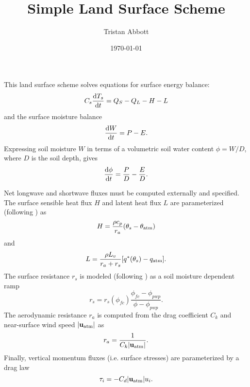 \documentclass[10pt]{article}
\title{Simple Land Surface Scheme}
\author{Tristan Abbott}
\date{\today}
\begin{document}
\maketitle

This land surface scheme solves equations for surface energy balance:
\begin{equation}
C_s \dv{T_s}{t} = Q_S - Q_L - H - L
\end{equation}
and the surface moisture balance
\begin{equation*}
\dv{W}{t} = P - E.
\end{equation*}
Expressing soil moisture $W$ in terms of a volumetric soil water content $\phi = W/D$, where $D$ is the soil depth, gives
\begin{equation}
\dv{\phi}{t} = \frac{P}{D} - \frac{E}{D}.
\end{equation}

Net longwave and shortwave fluxes must be computed externally and specified. The surface sensible heat flux $H$ and latent heat flux $L$ are parameterized (following \citet{RieckHoheneggerHeerwaarden2014}) as
\begin{equation} \label{eqn:H}
H = \frac{\rho c_p}{r_a} \qty (\theta_s - \theta_{\mathrm{atm}})
\end{equation}
and
\begin{equation} \label{eqn:S}
L = \frac{\rho L_v}{r_a + r_s} \qty [q^*(\theta_s) - q_{\mathrm{atm}}].
\end{equation}
The surface resistance $r_s$ is modeled (following \citet{HoheneggerStevens2018}) as a soil moisture dependent ramp
\begin{equation} \label{eqn:r_s}
r_s = r_s(\phi_{fc}) \frac{\phi_{fc} - \phi_{pwp}}{\phi - \phi_{pwp}}.
\end{equation}
The aerodynamic resistance $r_a$ is computed from the drag coefficient $C_k$ and near-surface wind speed $|{\bf u}_{\mathrm{atm}}|$ as
\begin{equation}
r_a = \frac{1}{C_k |{\bf u}_{\mathrm{atm}}|}.
\end{equation}
Finally, vertical momentum fluxes (i.e. surface stresses) are parameterized by a drag law
\begin{equation}
\tau_i = -C_d |{\bf u}_{\mathrm{atm}}| u_i.
\end{equation}
\end{document}
